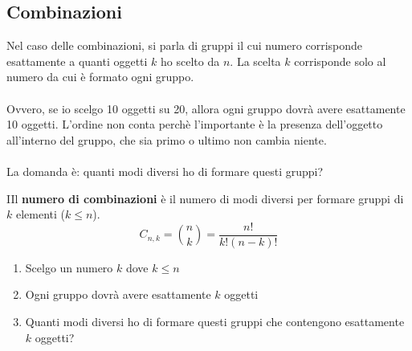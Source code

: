 \documentclass{article}  %
\theoremstyle{definition}
\begin{document}
\subsection{Combinazioni}
Nel caso delle combinazioni, si parla di gruppi il cui numero corrisponde esattamente a quanti oggetti $k$ ho scelto da $n$.
La scelta $k$ corrisponde solo al numero da cui è formato ogni gruppo.
\\ \\
Ovvero, se io scelgo 10 oggetti su 20, allora ogni gruppo dovrà avere esattamente 10 oggetti.
L'ordine non conta perchè l'importante è la presenza dell'oggetto all'interno del gruppo, che sia primo o ultimo non cambia niente.
\\ \\
La domanda è: quanti modi diversi ho di formare questi gruppi?
\begin{theorem}{}
	IIl \textbf{numero di combinazioni} è il numero di modi diversi per formare gruppi di $k$ elementi ($k \leq n$).
	\[
		C_{n,k}=\binom{n}{k}=\frac{n!}{k!(n-k)!}
	\]
	\begin{enumerate}
		\item Scelgo un numero $k$ dove $k \leq n$
		\item Ogni gruppo dovrà avere esattamente $k$ oggetti
		\item Quanti modi diversi ho di formare questi gruppi che contengono esattamente $k$ oggetti?
	\end{enumerate}
\end{theorem}
\end{document}
